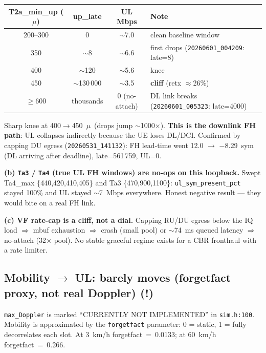 \documentclass[11pt,a4paper]{article}
\newcommand{\warn}{\textcolor{orange!85!black}{\textbf{(!)}}}
\newcommand{\us}{\ensuremath{\mu}\text{s}}
\begin{document}
\begin{table}[h]\centering\small
\begin{tabularx}{\linewidth}{@{}c c c X@{}}
\toprule
\textbf{T2a\_min\_up (\us)} & \textbf{up\_late} & \textbf{UL Mbps} & \textbf{Note} \\
\midrule
200--300 & 0          & $\sim$7.0 & clean baseline window \\
350 & $\sim$8         & $\sim$6.6 & first drops (\texttt{20260601\_004209}: late=8) \\
400 & $\sim$120       & $\sim$5.6 & knee \\
450 & $\sim$130\,000  & $\sim$3.5 & \textbf{cliff} (retx $\approx$26\%) \\
$\geq$600 & thousands & 0 (no-attach) & DL link breaks (\texttt{20260601\_005323}: late=4000) \\
\bottomrule
\end{tabularx}
\end{table}

Sharp knee at 400$\rightarrow$450~\us\ (drops jump $\sim$1000$\times$). \textbf{This is the
downlink FH path}: UL collapses indirectly because the UE loses DL/DCI. Confirmed by capping
DU egress (\texttt{20260531\_141132}): FH lead-time went 12.0 $\rightarrow$ $-$8.29~sym (DL
arriving after deadline), late=561\,759, UL=0.

\textbf{(b) \texttt{Ta3} / \texttt{Ta4} (true UL FH windows) are no-ops on this loopback.}
Swept Ta4\_max \{440,420,410,405\} and Ta3 \{470,900,1100\}:
\texttt{ul\_sym\_present\_pct} stayed 100\% and UL stayed $\sim$7~Mbps everywhere.
Honest negative result --- they would bite on a real FH link.

\textbf{(c) VF rate-cap is a cliff, not a dial.}
Capping RU/DU egress below the IQ load $\Rightarrow$ mbuf exhaustion $\Rightarrow$ crash
(small pool) or $\sim$74~ms queued latency $\Rightarrow$ no-attach (32$\times$ pool). No
stable graceful regime exists for a CBR fronthaul with a rate limiter.

\subsection{Mobility $\rightarrow$ UL: barely moves (forgetfact proxy, not real Doppler)
  \texorpdfstring{\warn}{[!]}}

\texttt{max\_Doppler} is marked ``CURRENTLY NOT IMPLEMENTED'' in \texttt{sim.h:100}. Mobility
is approximated by the \texttt{forgetfact} parameter: 0 = static, 1 = fully decorrelates
each slot. At 3~km/h forgetfact~=~0.0133; at 60~km/h forgetfact~=~0.266.
\end{document}

